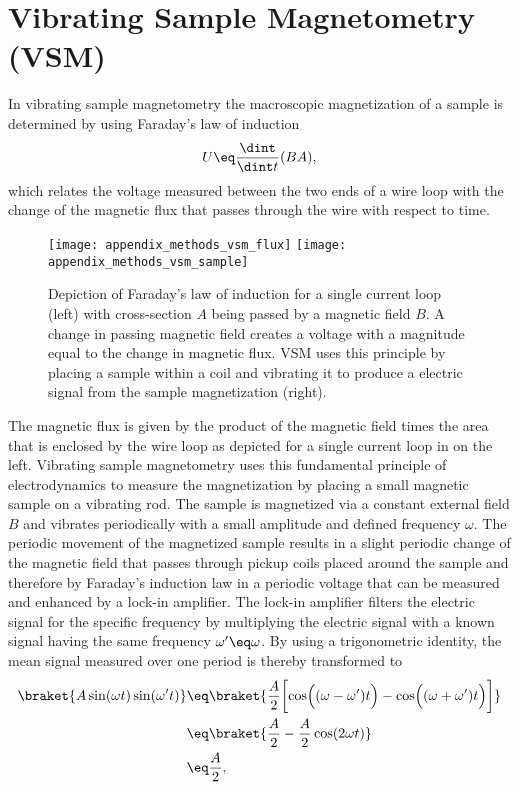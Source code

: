 \documentclass[\main/dresen_thesis.tex]{subfiles}
\begin{document}
  \section{Vibrating Sample Magnetometry (VSM)}
    \label{app:methods:vsm}
    In vibrating sample magnetometry the macroscopic magnetization of a sample is determined by using Faraday's law of induction
    \begin{align}
      U \eq \frac{\dint }{\dint t} (BA),
    \end{align}
    which relates the voltage measured between the two ends of a wire loop with the change of the magnetic flux that passes through the wire with respect to time.
    \begin{figure}[tb]
      \centering
      \texttt{[image: appendix\_methods\_vsm\_flux]}
      \texttt{[image: appendix\_methods\_vsm\_sample]}
      \caption{\label{fig:appendix:methods:vsm:flux}Depiction of Faraday's law of induction for a single current loop (left) with cross-section $A$ being passed by a magnetic field $B$. A change in passing magnetic field creates a voltage with a magnitude equal to the change in magnetic flux. VSM uses this principle by placing a sample within a coil and vibrating it to produce a electric signal from the sample magnetization (right).}
    \end{figure}
    The magnetic flux is given by the product of the magnetic field times the area that is enclosed by the wire loop as depicted for a single current loop in  on the left.
    Vibrating sample magnetometry uses this fundamental principle of electrodynamics to measure the magnetization by placing a small magnetic sample on a vibrating rod.
    The sample is magnetized via a constant external field $B$ and vibrates periodically with a small amplitude and defined frequency $\omega$.
    The periodic movement of the magnetized sample results in a slight periodic change of the magnetic field that passes through pickup coils placed around the sample and therefore by Faraday's induction law in a periodic voltage that can be measured and enhanced by a lock-in amplifier.
    The lock-in amplifier filters the electric signal for the specific frequency by multiplying the electric signal with a known signal having the same frequency $\omega^\prime \eq \omega$.
    By using a trigonometric identity, the mean signal measured over one period is thereby transformed to
    \begin{align}
      \begin{split}
        \braket{A \sin(\omega t) \sin(\omega^\prime t)}
          &\eq \braket{\frac{A}{2} \biggl[ \cos\Bigl((\omega - \omega^\prime) t \Bigr) - \cos\Bigl((\omega + \omega^\prime) t\Bigr) \biggr]}\\
          &\eq \braket{\frac{A}{2} - \frac{A}{2} \cos(2\omega t)}\\
          &\eq \frac{A}{2},
      \end{split}
    \end{align}
\end{document}
